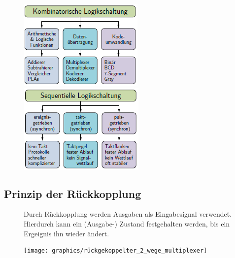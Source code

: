 \documentclass[12pt]{report}
\begin{document}
\begin{figure}[H]
  \begin{minipage}[T]{0.45\textwidth}
    \includegraphics[width=\textwidth]{graphics/kombinatorische_logikschaltung}
  \end{minipage}
  \hfill
  \begin{minipage}[T]{0.45\textwidth}
    \includegraphics[width=\textwidth]{graphics/sequentielle_logikschaltung}
  \end{minipage}
\end{figure}

\subsection{Prinzip der Rückkopplung}
\begin{defbox}[Rückkopplung]
  \begin{figure}[H]
    \begin{minipage}[T]{0.7\textwidth}
      Durch Rückkopplung werden Ausgaben als Eingabesignal verwendet. 
      Hierdurch kann ein (Ausgabe-) Zustand festgehalten werden, 
      bis ein Ergeignis ihn wieder ändert.
    \end{minipage}
    \hfill
    \begin{minipage}[T]{0.25\textwidth}
      \texttt{[image: graphics/rückgekoppelter\_2\_wege\_multiplexer]}
    \end{minipage}
  \end{figure}
\end{defbox}
\end{document}
